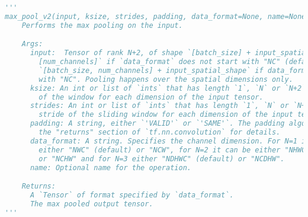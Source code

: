 \begin{lstlisting}[language=python, title=tf.nn.max\_pool 参数说明]
'''
max_pool_v2(input, ksize, strides, padding, data_format=None, name=None)
    Performs the max pooling on the input.

    Args:
      input:  Tensor of rank N+2, of shape `[batch_size] + input_spatial_shape +
        [num_channels]` if `data_format` does not start with "NC" (default), or
        `[batch_size, num_channels] + input_spatial_shape` if data_format starts
        with "NC". Pooling happens over the spatial dimensions only.
      ksize: An int or list of `ints` that has length `1`, `N` or `N+2`. The size
        of the window for each dimension of the input tensor.
      strides: An int or list of `ints` that has length `1`, `N` or `N+2`. The
        stride of the sliding window for each dimension of the input tensor.
      padding: A string, either `'VALID'` or `'SAME'`. The padding algorithm. See
        the "returns" section of `tf.nn.convolution` for details.
      data_format: A string. Specifies the channel dimension. For N=1 it can be
        either "NWC" (default) or "NCW", for N=2 it can be either "NHWC" (default)
        or "NCHW" and for N=3 either "NDHWC" (default) or "NCDHW".
      name: Optional name for the operation.

    Returns:
      A `Tensor` of format specified by `data_format`.
      The max pooled output tensor.
'''
\end{lstlisting}





